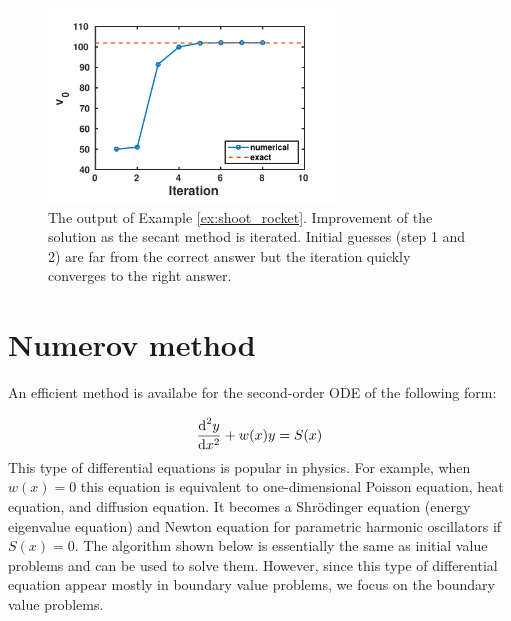 \begin{example}
\begin{figure}
\centering
\includegraphics[width=3in]{06.ode2/shoot_rocket.pdf}
\caption{The output of Example \ref{ex:shoot_rocket}. Improvement of the solution as the secant method is iterated.  Initial guesses (step 1 and 2)  are far from the correct answer but the iteration quickly converges to the right answer.}
\label{fig:shoot_rocket}
\end{figure}

\end{example}

\noindent
\section{Numerov method}

An efficient method is availabe for the second-order ODE of the following form:

\begin{equation}
\frac{\text{d}^2 y}{\text{d} x^2} + w(x) y = S(x)
\label{eq:sturm}
\end{equation}
This type of differential equations is popular in physics.  For example, when $w(x)=0$ this equation is equivalent to one-dimensional Poisson equation, heat equation, and diffusion equation.  It becomes a Shr\"{o}dinger equation (energy eigenvalue equation) and Newton equation for parametric harmonic oscillators if $S(x)=0$. 
The algorithm shown below is essentially the same as initial value problems and can be used to solve them.  However, since this type of differential equation appear mostly in boundary value problems, we focus on the boundary value problems. 

